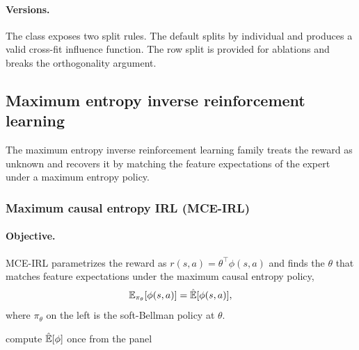 \paragraph{Versions.} The  class exposes two split rules. The default splits by individual and produces a valid cross-fit influence function. The row split is provided for ablations and breaks the orthogonality argument.

\subsection{Maximum entropy inverse reinforcement learning}

The maximum entropy inverse reinforcement learning family treats the reward as unknown and recovers it by matching the feature expectations of the expert under a maximum entropy policy.

\subsubsection{Maximum causal entropy IRL (MCE-IRL)}

\paragraph{Objective.} MCE-IRL \citep{ziebart2010} parametrizes the reward as $r(s, a) = \theta^\top \phi(s, a)$ and finds the $\theta$ that matches feature expectations under the maximum causal entropy policy,
\begin{equation}
\mathbb{E}_{\pi_\theta}[\phi(s, a)] = \hat {\mathbb{E}}[\phi(s, a)],
\label{eq:mce}
\end{equation}
where $\pi_\theta$ on the left is the soft-Bellman policy at $\theta$.

\begin{algorithm}[H]
\SetAlgoLined
{}
compute $\hat {\mathbb{E}}[\phi]$ once from the panel\;
\caption{Maximum causal entropy gradient path}
\end{algorithm}

